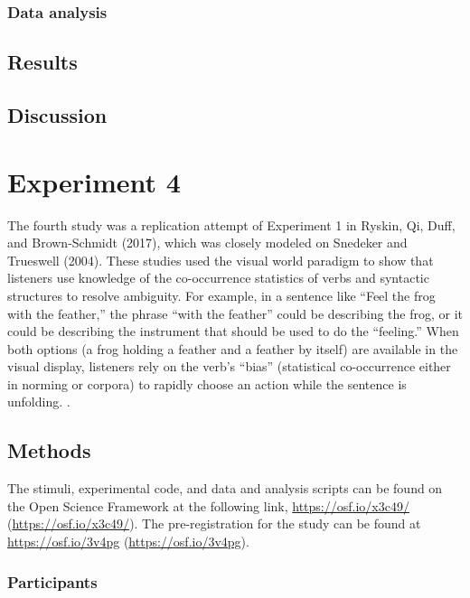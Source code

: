 \documentclass[
  english,
  man,floatsintext]{apa6}
\begin{document}
\hypertarget{data-analysis-1}{%
\subsubsection{Data analysis}\label{data-analysis-1}}

\hypertarget{results-2}{%
\subsection{Results}\label{results-2}}

\hypertarget{discussion-2}{%
\subsection{Discussion}\label{discussion-2}}

\hypertarget{experiment-4}{%
\section{Experiment 4}\label{experiment-4}}

The fourth study was a replication attempt of Experiment 1 in Ryskin, Qi, Duff, and Brown-Schmidt (2017), which was closely modeled on Snedeker and Trueswell (2004). These studies used the visual world paradigm to show that listeners use knowledge of the co-occurrence statistics of verbs and syntactic structures to resolve ambiguity. For example, in a sentence like ``Feel the frog with the feather,'' the phrase ``with the feather'' could be describing the frog, or it could be describing the instrument that should be used to do the ``feeling.'' When both options (a frog holding a feather and a feather by itself) are available in the visual display, listeners rely on the verb's ``bias'' (statistical co-occurrence either in norming or corpora) to rapidly choose an action while the sentence is unfolding.
.

\hypertarget{methods-3}{%
\subsection{Methods}\label{methods-3}}

The stimuli, experimental code, and data and analysis scripts can be found on the Open Science Framework at the following link, \url{https://osf.io/x3c49/} (\url{https://osf.io/x3c49/}). The pre-registration for the study can be found at \url{https://osf.io/3v4pg} (\url{https://osf.io/3v4pg}).

\hypertarget{participants-4}{%
\subsubsection{Participants}\label{participants-4}}
\end{document}
